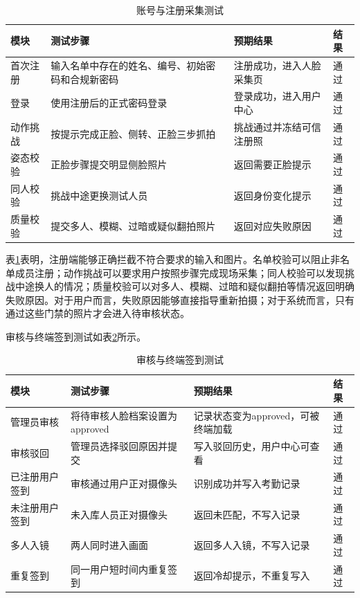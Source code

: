 \begin{table}[H]
    \centering
    \caption{账号与注册采集测试}
    \label{tab:account_capture_test}
    \begin{tabularx}{\textwidth}{p{3cm}p{4.5cm}p{4.5cm}p{1.7cm}}
        \toprule
        \textbf{模块} & \textbf{测试步骤} & \textbf{预期结果} & \textbf{结果} \\
        \midrule
        首次注册 & 输入名单中存在的姓名、编号、初始密码和合规新密码 & 注册成功，进入人脸采集页 & 通过 \\
        登录 & 使用注册后的正式密码登录 & 登录成功，进入用户中心 & 通过 \\
        动作挑战 & 按提示完成正脸、侧转、正脸三步抓拍 & 挑战通过并冻结可信注册照 & 通过 \\
        姿态校验 & 正脸步骤提交明显侧脸照片 & 返回需要正脸提示 & 通过 \\
        同人校验 & 挑战中途更换测试人员 & 返回身份变化提示 & 通过 \\
        质量校验 & 提交多人、模糊、过暗或疑似翻拍照片 & 返回对应失败原因 & 通过 \\
        \bottomrule
    \end{tabularx}
\end{table}

表\ref{tab:account_capture_test}表明，注册端能够正确拦截不符合要求的输入和图片。名单校验可以阻止非名单成员注册；动作挑战可以要求用户按照步骤完成现场采集；同人校验可以发现挑战中途换人的情况；质量校验可以对多人、模糊、过暗和疑似翻拍等情况返回明确失败原因。对于用户而言，失败原因能够直接指导重新拍摄；对于系统而言，只有通过这些门禁的照片才会进入待审核状态。

审核与终端签到测试如表\ref{tab:review_attendance_test}所示。

\begin{table}[H]
    \centering
    \caption{审核与终端签到测试}
    \label{tab:review_attendance_test}
    \begin{tabularx}{\textwidth}{p{3cm}p{4.5cm}p{4.5cm}p{1.7cm}}
        \toprule
        \textbf{模块} & \textbf{测试步骤} & \textbf{预期结果} & \textbf{结果} \\
        \midrule
        管理员审核 & 将待审核人脸档案设置为approved & 记录状态变为approved，可被终端加载 & 通过 \\
        审核驳回 & 管理员选择驳回原因并提交 & 写入驳回历史，用户中心可查看 & 通过 \\
        已注册用户签到 & 审核通过用户正对摄像头 & 识别成功并写入考勤记录 & 通过 \\
        未注册用户签到 & 未入库人员正对摄像头 & 返回未匹配，不写入记录 & 通过 \\
        多人入镜 & 两人同时进入画面 & 返回多人入镜，不写入记录 & 通过 \\
        重复签到 & 同一用户短时间内重复签到 & 返回冷却提示，不重复写入 & 通过 \\
        \bottomrule
    \end{tabularx}
\end{table}

